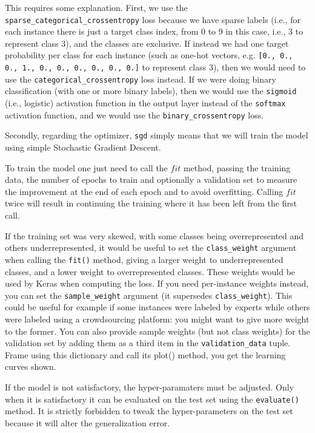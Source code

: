 This requires some explanation. First, we use the \lstinline+sparse_categorical+\lstinline+_crossentropy+ loss because we have sparse labels (i.e., for each instance there is just a target class index, from 0 to 9 in this case, i.e., 3 to represent class 3), and the classes are exclusive. If instead we had one target probability per class for each instance (such as one-hot vectors, e.g. \lstinline+[0., 0., 0., 1., 0., 0., 0., 0., 0., 0.]+ to represent class 3), then we would need to use the \lstinline+categorical_crossentropy+ loss instead. If we were doing binary classification (with one or more binary labels), then we would use the \lstinline+sigmoid+ (i.e., logistic) activation function in the output layer instead of the \lstinline+softmax+ activation function, and we would use the \lstinline+binary_crossentropy+ loss.

Secondly, regarding the optimizer, \lstinline+sgd+ simply means that we will train the model using simple Stochastic Gradient Descent.

To train the model one just need to call the $fit$ method, passing the training data, the number of epochs to train and optionally a validation set to measure the improvement at the end of each epoch and to avoid overfitting. Calling  $fit$ twice will result in continuing the training where it has been left from the first call.

If the training set was very skewed, with some classes being overrepresented and others underrepresented, it would be useful to set the \lstinline+class_weight+ argument when calling the \lstinline+fit()+ method, giving a larger weight to underrepresented classes, and a lower weight to overrepresented classes. These weights would be used by Keras when computing the loss. If you need per-instance weights instead, you can set the \lstinline+sample_weight+ argument (it supersedes \lstinline+class_weight+). This could be useful for example if some instances were labeled by experts while others were labeled using a crowdsourcing platform: you might want to give more weight to the former. You can also provide sample weights (but not class weights) for the validation set by adding them as a third item in the \lstinline+validation_data+ tuple.
Frame using this dictionary and call its plot() method, you get the learning curves shown.

If the model is not satisfactory, the hyper-paramaters must be adjusted. Only when it is satisfactory it can be evaluated on the test set using the \lstinline+evaluate()+ method. It is strictly forbidden to tweak the hyper-parameters on the test set because it will alter the generalization error.

